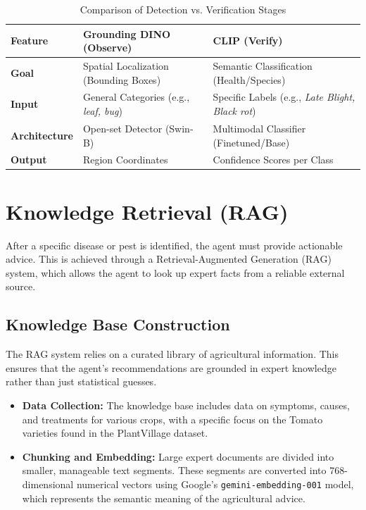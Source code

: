 \begin{table}[h]
	\centering
	\caption{Comparison of Detection vs. Verification Stages}
	{\renewcommand{\arraystretch}{1.5}
	\begin{tabular}{lp{6cm}p{5cm}}
		\toprule
		\textbf{Feature} & \textbf{Grounding DINO (Observe)} & \textbf{CLIP (Verify)} \\ 
		\hline
		\textbf{Goal} & Spatial Localization (Bounding Boxes) & Semantic Classification (Health/Species) \\ 
		\textbf{Input} & General Categories (e.g., \textit{leaf, bug}) & Specific Labels (e.g., \textit{Late Blight, Black rot}) \\ 
		\textbf{Architecture} & Open-set Detector (Swin-B) & Multimodal Classifier (Finetuned/Base) \\ 
		\textbf{Output} & Region Coordinates & Confidence Scores per Class \\ 
		\bottomrule
	\end{tabular}
	}
	\label{tab:detection_vs_verification}
\end{table}


\section{Knowledge Retrieval (RAG)}
After a specific disease or pest is identified, the agent must provide actionable advice. This is achieved through a Retrieval-Augmented Generation (RAG) system, which allows the agent to look up expert facts from a reliable external source.

\subsection{Knowledge Base Construction}
The RAG system relies on a curated library of agricultural information. This ensures that the agent's recommendations are grounded in expert knowledge rather than just statistical guesses.

\begin{itemize}
	\item \textbf{Data Collection:} The knowledge base includes data on symptoms, causes, and treatments for various crops, with a specific focus on the Tomato varieties found in the PlantVillage dataset.
	\item \textbf{Chunking and Embedding:} Large expert documents are divided into smaller, manageable text segments. These segments are converted into 768-dimensional numerical vectors using Google's \texttt{gemini-embedding-001} model, which represents the semantic meaning of the agricultural advice.
\end{itemize}

